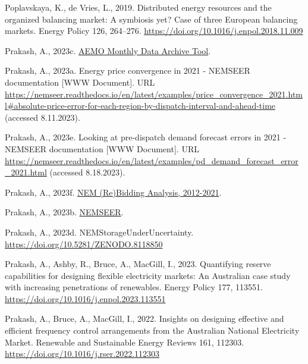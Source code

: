\documentclass[12pt,a4paper,]{report}
\newlength{\cslhangindent}
\newenvironment{CSLReferences}[2] %
 {%
  \setlength{\parindent}{0pt}
  \ifodd #1 \everypar{\setlength{\hangindent}{\cslhangindent}}\ignorespaces\fi
  \ifnum #2 > 0
  \setlength{\parskip}{#2\baselineskip}
  \fi
 }%
 {}
\begin{document}
\begin{CSLReferences}{1}{0}
\leavevmode{}%
Poplavskaya, K., de Vries, L., 2019. Distributed energy resources and
the organized balancing market: {A} symbiosis yet? {Case} of three
{European} balancing markets. Energy Policy 126, 264--276.
\url{https://doi.org/10.1016/j.enpol.2018.11.009}

\leavevmode{}%
Prakash, A., 2023c.
\href{https://github.com/prakaa/mms-monthly-cli}{{AEMO Monthly Data
Archive Tool}}.

\leavevmode{}%
Prakash, A., 2023a. Energy price convergence in 2021 - {NEMSEER}
documentation {[}WWW Document{]}. URL
\url{https://nemseer.readthedocs.io/en/latest/examples/price_convergence_2021.html\#absolute-price-error-for-each-region-by-dispatch-interval-and-ahead-time}
(accessed 8.11.2023).

\leavevmode{}%
Prakash, A., 2023e. Looking at pre-dispatch demand forecast errors in
2021 - {NEMSEER} documentation {[}WWW Document{]}. URL
\url{https://nemseer.readthedocs.io/en/latest/examples/pd_demand_forecast_error_2021.html}
(accessed 8.18.2023).

\leavevmode{}%
Prakash, A., 2023f.
\href{https://github.com/prakaa/nem-rebidding-analysis-2012-2021}{{NEM}
({Re}){Bidding Analysis}, 2012-2021}.

\leavevmode{}%
Prakash, A., 2023b.
\href{https://doi.org/10.5281/zenodo.7397514}{{NEMSEER}}.

\leavevmode{}%
Prakash, A., 2023d. {NEMStorageUnderUncertainty}.
\url{https://doi.org/10.5281/ZENODO.8118850}

\leavevmode{}%
Prakash, A., Ashby, R., Bruce, A., MacGill, I., 2023. Quantifying
reserve capabilities for designing flexible electricity markets: {An
Australian} case study with increasing penetrations of renewables.
Energy Policy 177, 113551.
\url{https://doi.org/10.1016/j.enpol.2023.113551}

\leavevmode{}%
Prakash, A., Bruce, A., MacGill, I., 2022. Insights on designing
effective and efficient frequency control arrangements from the
{Australian National Electricity Market}. Renewable and Sustainable
Energy Reviews 161, 112303.
\url{https://doi.org/10.1016/j.rser.2022.112303}


\end{CSLReferences}
\end{document}
